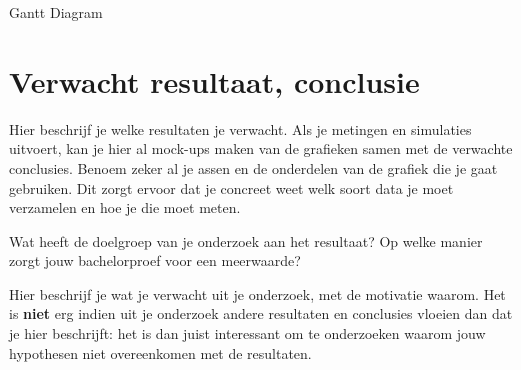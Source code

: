 Gantt Diagram


\section{Verwacht resultaat, conclusie}%
\label{sec:verwachte_resultaten}

Hier beschrijf je welke resultaten je verwacht. Als je metingen en simulaties uitvoert, kan je hier al mock-ups maken van de grafieken samen met de verwachte conclusies. Benoem zeker al je assen en de onderdelen van de grafiek die je gaat gebruiken. Dit zorgt ervoor dat je concreet weet welk soort data je moet verzamelen en hoe je die moet meten.

Wat heeft de doelgroep van je onderzoek aan het resultaat? Op welke manier zorgt jouw bachelorproef voor een meerwaarde?

Hier beschrijf je wat je verwacht uit je onderzoek, met de motivatie waarom. Het is \textbf{niet} erg indien uit je onderzoek andere resultaten en conclusies vloeien dan dat je hier beschrijft: het is dan juist interessant om te onderzoeken waarom jouw hypothesen niet overeenkomen met de resultaten.

